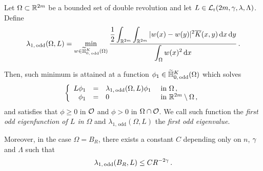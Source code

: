 \begin{lemma}
\label{Lemma:FirstOddEigenfunction}
Let $\Omega\subset \mathbb{R}^{2m} $ be a bounded set of double revolution and let $L\in \mathcal{L}_{\mathrm{r}}(2m,\gamma,\lambda, \Lambda)$. Define 
\begin{equation}
\label{Eq:DefLambda1}
\lambda_{1, \, \mathrm{odd}}(\Omega, L) = \min_{w \in \widetilde{\mathbb{H}}^K_{0, \, \mathrm{odd}}(\Omega)} \dfrac{\dfrac{1}{2}  \displaystyle\int_{\mathbb{R}^{2m}} \int_{\mathbb{R}^{2m}} |w(x) - w(y)|^2 \overline{K}(x,y) \,\mathrm{d} x \,\mathrm{d} y}{ \displaystyle \int_\Omega w(x)^2 \,\mathrm{d} x}\,.
\end{equation}

Then, such minimum is attained at a function $\phi_1\in \widetilde{\mathbb{H}}^K_{0, \, \mathrm{odd}}(\Omega)$ which solves
$$
\left\{\begin{array}{rcll}
L\phi_1 &=& \lambda_{1, \, \mathrm{odd}}(\Omega, L) \phi_1 & \textrm{ in } \Omega\,,\\
\phi_1 & = & 0 & \textrm{ in } \mathbb{R}^{2m}\setminus \Omega\,,
\end{array} \right.
$$
and satisfies that $\phi \geq 0$ in $\mathcal{O}$ and $\phi > 0$ in $\Omega \cap \mathcal{O}$.
We call such function the \emph{first odd eigenfunction of $L$ in $\Omega$} and $\lambda_{1, \, \mathrm{odd}}(\Omega, L) $ the \emph{first odd eigenvalue}. 

Moreover, in the case $\Omega = B_R$, there exists a constant $C$ depending only on $n$, $\gamma$ and $\Lambda$ such that
$$
\lambda_{1, \, \mathrm{odd}}(B_R, L) \leq C R^{-2\gamma}\,. 
$$ 
\end{lemma}


